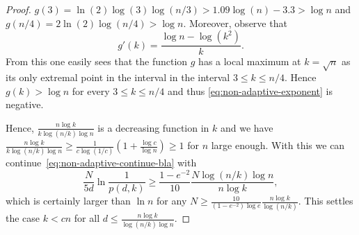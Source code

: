 \documentclass[english,a4paper,11pt]{article}
\begin{document}
{\begin{proof}
$g(3) = \ln(2) \log(3) \log (n/3) > 1.09 \log(n) - 3.3 > \log n$
and 
$g(n/4) = 2\ln(2) \log(n/4)>\log n$. %
Moreover, observe that
\[
g'(k) = \frac{\log n - \log(k^2)}{k}.
\]
From this one easily sees that the function $g$ has a local maximum at $k=\sqrt{n}$ as its only extremal point in the interval in the interval $3 \le k \le n/4$.
Hence $g(k) > \log n$ for every $3 \le k \le n/4$ and thus \eqref{eq:non-adaptive-exponent} is negative.

Hence, $\frac{n \log k}{k \log(n/k) \log n}$ is a decreasing function in $k$ and we have $\frac{n \log k}{k \log(n/k) \log n} \ge \frac{1}{c \log(1/c)} \left(1 + \frac{\log c}{\log n} \right) \ge 1$ for $n$ large enough. With this we can continue~\eqref{eq:non-adaptive-continue-bla} with
\[
\frac{N}{5d} \ln \frac{1}{p(d,k)} \ge \frac{1-e^{-2}}{10} \frac{N \log(n/k) \log n}{n \log k},
\]
which is certainly larger than $\ln n$ for any $N \ge \frac{10}{(1-e^{-2}) \log e} \frac{n \log k}{\log(n/k)}$. This settles the case $k<cn$ for all $d \le \frac{n \log k}{\log(n/k) \log n}$.


\end{proof}}
\end{document}
